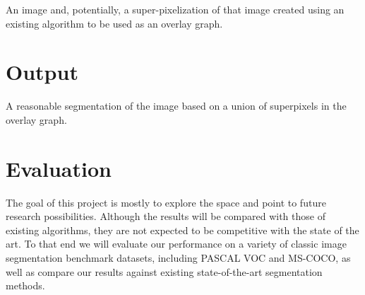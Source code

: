 \documentclass[twocolumn]{article}
\begin{document}
An image and, potentially, a super-pixelization of that image created using an existing algorithm to be used as an overlay
graph.

\section{Output}

A reasonable segmentation of the image based on a union of superpixels in the overlay graph.

\section{Evaluation}

The goal of this project is mostly to explore the space and point to future research possibilities. Although the results will
be compared with those of existing algorithms, they are not expected to be competitive with the state of the art. To that end
we will evaluate our performance on a variety of classic image segmentation benchmark datasets, including PASCAL VOC and
MS-COCO, as well as compare our results against existing state-of-the-art segmentation methods. 


 
\end{document}
